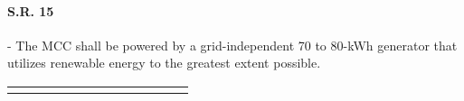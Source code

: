 \begin{fullwidth}
\begin{landscape}
    \newpage
    
    
    \paragraph{S.R. 15} - The MCC shall be powered by a grid-independent 70 to 80-kWh generator that utilizes renewable energy to the greatest extent possible.
    
    {\fontsize{10pt}{11pt}\selectfont
    \begin{longtable}{| L{0.12\linewidth} | L{0.16\linewidth} |  L{0.20\linewidth} | L{0.08\linewidth} | L{0.20\linewidth} | L{0.08\linewidth} |}
        \hline \endlastfoot
        

\end{longtable}}
\end{landscape}
\end{fullwidth}
